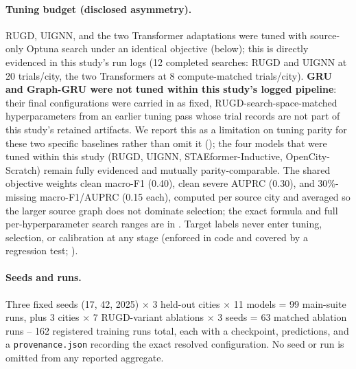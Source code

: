 \paragraph{Tuning budget (disclosed asymmetry).} RUGD, UIGNN, and the two Transformer adaptations
were tuned with source-only Optuna search under an identical objective (below); this is directly
evidenced in this study's run logs (12 completed searches: RUGD and UIGNN at 20 trials/city, the
two Transformers at 8 compute-matched trials/city). \textbf{GRU and Graph-GRU were not tuned within
this study's logged pipeline}: their final configurations were carried in as fixed,
RUGD-search-space-matched hyperparameters from an earlier tuning pass whose trial records are not
part of this study's retained artifacts. We report this as a limitation on tuning parity for these
two specific baselines rather than omit it (); the four models that were
tuned within this study (RUGD, UIGNN, STAEformer-Inductive, OpenCity-Scratch) remain fully
evidenced and mutually parity-comparable. The shared objective weights clean macro-F1 (0.40),
clean severe AUPRC (0.30), and 30\%-missing macro-F1/AUPRC (0.15 each), computed per source city
and averaged so the larger source graph does not dominate selection; the exact formula and full
per-hyperparameter search ranges are in . Target labels never enter
tuning, selection, or calibration at any stage (enforced in code and covered by a regression
test; ).

\paragraph{Seeds and runs.} Three fixed seeds (17, 42, 2025) $\times$ 3 held-out cities $\times$
11 models = 99 main-suite runs, plus 3 cities $\times$ 7 RUGD-variant ablations $\times$ 3 seeds =
63 matched ablation runs -- 162 registered training runs total, each with a checkpoint,
predictions, and a \texttt{provenance.json} recording the exact resolved configuration. No seed or
run is omitted from any reported aggregate.

